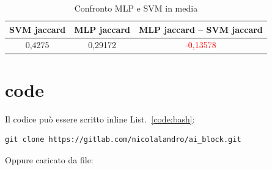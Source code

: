 \begin {table}[H]
\caption {Confronto MLP e SVM in media} \label{tab:mlp} 
\begin{center}
\begin{tabular}{|c|c|c|}
  
  \hline
  \rowcolor[gray]{.6}
  \textbf{SVM jaccard} & \textbf{MLP jaccard} & \textbf{MLP jaccard – SVM jaccard} \\
  
  \hline
  \rowcolor[gray]{.8}
  0,4275 & 0,29172 & \textcolor{red}{-0,13578}\\
  \hline
\end{tabular} 
\end{center}
\end{table}

\section{code}

Il codice può essere scritto inline List.~\ref{code:bash}:
\begin{lstlisting}[language=DebianBash, style=basic, label=code:bash, caption=sample bash]
git clone https://gitlab.com/nicolalandro/ai_block.git
\end{lstlisting}

Oppure caricato da file:


